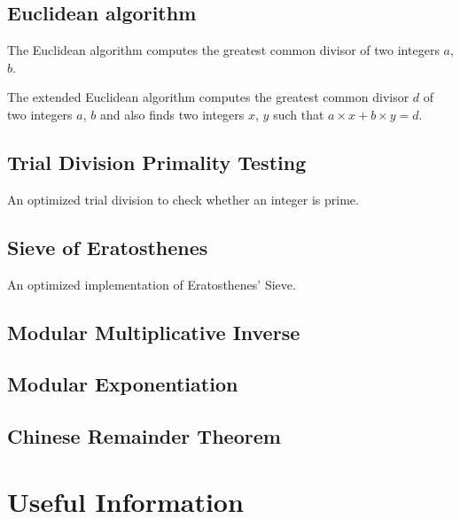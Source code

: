 \documentclass[11pt,a4paper,titlepage]{article}
\begin{document}
			

			

			

		\subsection{Euclidean algorithm}
			The Euclidean algorithm computes the greatest common divisor of two integers $a$, $b$.
			

			The extended Euclidean algorithm computes the greatest common divisor $d$ of two integers $a$, $b$ and also finds two integers $x$, $y$ such that $a\times x + b\times y = d$.
			

		\subsection{Trial Division Primality Testing}
			An optimized trial division to check whether an integer is prime.
			

		\subsection{Sieve of Eratosthenes}
			An optimized implementation of Eratosthenes' Sieve.
			

		\subsection{Modular Multiplicative Inverse}
			

		\subsection{Modular Exponentiation}
			

		\subsection{Chinese Remainder Theorem}
			

	\section{Useful Information}
\end{document}
